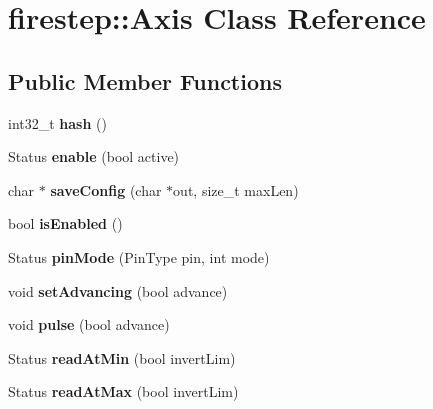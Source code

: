 \hypertarget{classfirestep_1_1_axis}{\section{firestep\+:\+:Axis Class Reference}
\label{classfirestep_1_1_axis}
}
\subsection*{Public Member Functions}
\begin{DoxyCompactItemize}
\item 
\hypertarget{classfirestep_1_1_axis_ad972a0d2b69b10ddef19f0cdb5adad64}{int32\+\_\+t {\bfseries hash} ()}\label{classfirestep_1_1_axis_ad972a0d2b69b10ddef19f0cdb5adad64}

\item 
\hypertarget{classfirestep_1_1_axis_a2328e38e58c3f7091b5a4fb32289174b}{Status {\bfseries enable} (bool active)}\label{classfirestep_1_1_axis_a2328e38e58c3f7091b5a4fb32289174b}

\item 
\hypertarget{classfirestep_1_1_axis_a5272981ccc6d7c16f5002a58b8702cb4}{char $\ast$ {\bfseries save\+Config} (char $\ast$out, size\+\_\+t max\+Len)}\label{classfirestep_1_1_axis_a5272981ccc6d7c16f5002a58b8702cb4}

\item 
\hypertarget{classfirestep_1_1_axis_a720fb76c3c6587792470922aa8c57744}{bool {\bfseries is\+Enabled} ()}\label{classfirestep_1_1_axis_a720fb76c3c6587792470922aa8c57744}

\item 
\hypertarget{classfirestep_1_1_axis_ab81177f162fb71af05402da74ad717fb}{Status {\bfseries pin\+Mode} (Pin\+Type pin, int mode)}\label{classfirestep_1_1_axis_ab81177f162fb71af05402da74ad717fb}

\item 
\hypertarget{classfirestep_1_1_axis_a3716989756982f61b8e886ea0d50768c}{void {\bfseries set\+Advancing} (bool advance)}\label{classfirestep_1_1_axis_a3716989756982f61b8e886ea0d50768c}

\item 
\hypertarget{classfirestep_1_1_axis_a6b6b1a62be19832c38c24abb89378d8c}{void {\bfseries pulse} (bool advance)}\label{classfirestep_1_1_axis_a6b6b1a62be19832c38c24abb89378d8c}

\item 
\hypertarget{classfirestep_1_1_axis_a7f5f96bbba6d09959f28fd09567c9291}{Status {\bfseries read\+At\+Min} (bool invert\+Lim)}\label{classfirestep_1_1_axis_a7f5f96bbba6d09959f28fd09567c9291}

\item 
\hypertarget{classfirestep_1_1_axis_a281ece16ee240a5a96150805615cd7a8}{Status {\bfseries read\+At\+Max} (bool invert\+Lim)}\label{classfirestep_1_1_axis_a281ece16ee240a5a96150805615cd7a8}

\end{DoxyCompactItemize}
